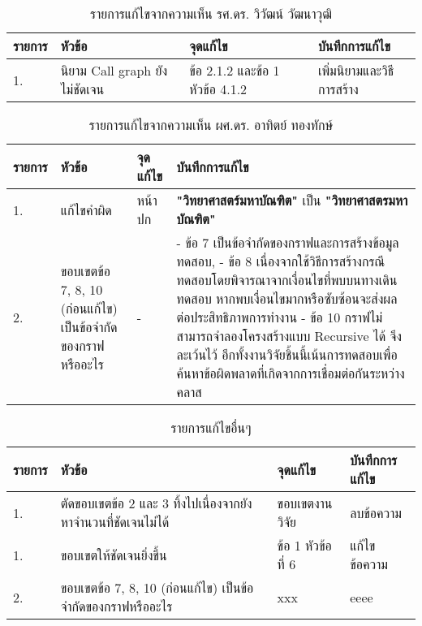 \begin{table}[ht!]
    \caption{รายการแก้ไขจากความเห็น รศ.ดร. วิวัฒน์ วัฒนาวุฒิ}
    \centering
    \begin{tabularx}{\textwidth}{|l|l|l|X|}
        \hline
        \rowcolor{LightGray} 
        {\bf รายการ}    & {\bf หัวข้อ}                            & {\bf จุดแก้ไข}          & {\bf บันทึกการแก้ไข} \\ \hline
        1.              & นิยาม Call graph ยังไม่ชัดเจน             & ข้อ 2.1.2 และข้อ 1 หัวข้อ 4.1.2       & เพิ่มนิยามและวิธีการสร้าง \\ \hline
    \end{tabularx}
\end{table}

\begin{table}[ht!]
    \caption{รายการแก้ไขจากความเห็น ผศ.ดร. อาทิตย์ ทองทักษ์}
    \centering
    \begin{tabularx}{\textwidth}{|l|l|l|X|}
        \hline
        \rowcolor{LightGray} 
        {\bf รายการ}    & {\bf หัวข้อ}                            & {\bf จุดแก้ไข}          & {\bf บันทึกการแก้ไข} \\ \hline
        1.              & แก้ไขคำผิด                              & หน้าปก                 & {\bf "วิทยาศาสตร์มหาบัณฑิต"} เป็น {\bf "วิทยาศาสตรมหาบัณฑิต"} \\ \hline
        2.              & ขอบเขตข้อ 7, 8, 10 (ก่อนแก้ไข) เป็นข้อจำกัดของกราฟหรืออะไร      
                        & -                   
                        & - ข้อ 7 เป็นข้อจำกัดของกราฟและการสร้างข้อมูลทดสอบ, \newline 
                          - ข้อ 8 เนื่องจากใช้วิธีการสร้างกรณีทดสอบโดยพิจารณาจากเงื่อนไขที่พบบนทางเดินทดสอบ หากพบเงื่อนไขมากหรือซับซ้อนจะส่งผลต่อประสิทธิภาพการทำงาน \newline  
                          - ข้อ 10 กราฟไม่สามารถจำลองโครงสร้างแบบ Recursive ได้ จึงละเว้นไว้ อีกทั้งงานวิจัยชิ้นนี้เน้นการทดสอบเพื่อค้นหาข้อผิดพลาดที่เกิดจากการเชื่อมต่อกันระหว่างคลาส \\ \hline
    \end{tabularx}
\end{table}

\begin{table}[ht!]
    \caption{รายการแก้ไขอื่นๆ}
    \centering
    \begin{tabularx}{\textwidth}{|l|l|l|X|}
        \hline
        \rowcolor{LightGray} 
        {\bf รายการ}    & {\bf หัวข้อ}                                            & {\bf จุดแก้ไข}          & {\bf บันทึกการแก้ไข} \\ \hline
        1.              & ตัดขอบเขตข้อ 2 และ 3 ทิ้งไปเนื่องจากยังหาจำนวนที่ชัดเจนไม่ได้     & ขอบเขตงานวิจัย          & ลบข้อความ \\ \hline
        1.              & ขอบเขตให้ชัดเจนยิ่งขึ้น                                     & ข้อ 1 หัวข้อที่ 6          & แก้ไขข้อความ  \\ \hline
        2.              & ขอบเขตข้อ 7, 8, 10 (ก่อนแก้ไข) เป็นข้อจำกัดของกราฟหรืออะไร      & xxx                   & eeee \\ \hline
    \end{tabularx}
\end{table}
